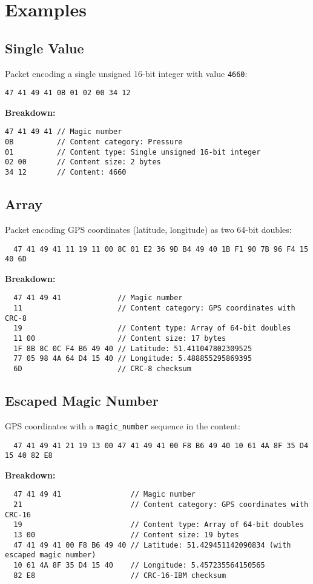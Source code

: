 \documentclass[a4paper]{article}
\begin{document}
\section{Examples}
\subsection{Single Value}
Packet encoding a single unsigned 16-bit integer with value \texttt{4660}:
\begin{verbatim}
47 41 49 41 0B 01 02 00 34 12
\end{verbatim}
\textbf{Breakdown:}
\begin{verbatim}
47 41 49 41 // Magic number
0B          // Content category: Pressure
01          // Content type: Single unsigned 16-bit integer
02 00       // Content size: 2 bytes
34 12       // Content: 4660
\end{verbatim}

\subsection{Array}
Packet encoding GPS coordinates (latitude, longitude) as two 64-bit doubles:
\begin{verbatim}
  47 41 49 41 11 19 11 00 8C 01 E2 36 9D B4 49 40 1B F1 90 7B 96 F4 15 40 6D
\end{verbatim}
\textbf{Breakdown:}
\begin{verbatim}
  47 41 49 41             // Magic number
  11                      // Content category: GPS coordinates with CRC-8
  19                      // Content type: Array of 64-bit doubles
  11 00                   // Content size: 17 bytes
  1F 8B 8C 0C F4 B6 49 40 // Latitude: 51.411047802309525
  77 05 98 4A 64 D4 15 40 // Longitude: 5.488855295869395
  6D                      // CRC-8 checksum
\end{verbatim}

\subsection{Escaped Magic Number}
GPS coordinates with a \texttt{magic\_number} sequence in the content:
\begin{verbatim}
  47 41 49 41 21 19 13 00 47 41 49 41 00 F8 B6 49 40 10 61 4A 8F 35 D4 15 40 82 E8
\end{verbatim}
\textbf{Breakdown:}
\begin{verbatim}
  47 41 49 41                // Magic number
  21                         // Content category: GPS coordinates with CRC-16
  19                         // Content type: Array of 64-bit doubles
  13 00                      // Content size: 19 bytes
  47 41 49 41 00 F8 B6 49 40 // Latitude: 51.429451142090834 (with escaped magic number)
  10 61 4A 8F 35 D4 15 40    // Longitude: 5.457235564150565
  82 E8                      // CRC-16-IBM checksum
\end{verbatim}
\end{document}
